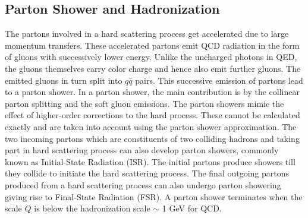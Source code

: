 \subsection{Parton Shower and Hadronization}
The partons involved in a hard scattering process get accelerated due to large momentum transfers. These accelerated partons emit QCD radiation in the form of gluons with successively lower energy. Unlike the uncharged photons in QED, the gluons themselves carry color charge and hence also emit further gluons. The emitted gluons in turn split into $q\bar{q}$ pairs. This successive emission of partons lead to a parton shower. In a parton shower, the main contribution is by the collinear parton splitting and the soft gluon emissions. The parton showers mimic the effect of higher-order corrections to the hard process. These cannot be calculated exactly and are taken into account using the parton shower approximation. The two incoming partons which are constituents of two colliding hadrons and taking part in hard scattering process can also develop parton showers, commonly known as Initial-State Radiation (ISR). The initial partons produce showers till they collide to initiate the hard scattering process. The final outgoing partons produced from a hard scattering process can also undergo parton showering giving rise to Final-State Radiation (FSR). A parton shower terminates when the scale $Q$ is below the hadronization scale $\sim$ 1 GeV for QCD.

